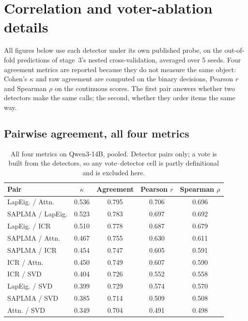 \section{Correlation and voter-ablation details}
\label{sec:correlation_details}

All figures below use each detector under its own published probe, on the
out-of-fold predictions of stage~3's nested cross-validation, averaged over 5 seeds. Four
agreement metrics are reported because they do not measure the same object: Cohen's
$\kappa$ and raw agreement are computed on the binary decisions, Pearson $r$ and
Spearman $\rho$ on the continuous scores. The first pair answers whether two detectors
make the same calls; the second, whether they order items the same way.

\subsection{Pairwise agreement, all four metrics}

\begin{table}[h]
  \centering
  \caption{All four metrics on Qwen3-14B, pooled. Detector pairs only; a vote is
  built from the detectors, so any vote--detector cell is partly definitional and
  is excluded here.}
  \footnotesize
  \begin{tabular}{l c c c c}
    \hline
    Pair & $\kappa$ & Agreement & Pearson $r$ & Spearman $\rho$ \\
    \hline
    LapEig. / Attn. & 0.536 & 0.795 & 0.706 & 0.696 \\
    SAPLMA / LapEig. & 0.523 & 0.783 & 0.697 & 0.692 \\
    LapEig. / ICR & 0.510 & 0.778 & 0.687 & 0.679 \\
    SAPLMA / Attn. & 0.467 & 0.755 & 0.630 & 0.611 \\
    SAPLMA / ICR & 0.454 & 0.747 & 0.605 & 0.591 \\
    ICR / Attn. & 0.450 & 0.749 & 0.607 & 0.590 \\
    ICR / SVD & 0.404 & 0.726 & 0.552 & 0.558 \\
    LapEig. / SVD & 0.399 & 0.729 & 0.574 & 0.570 \\
    SAPLMA / SVD & 0.385 & 0.714 & 0.509 & 0.508 \\
    Attn. / SVD & 0.349 & 0.704 & 0.491 & 0.498 \\
    \hline
  \end{tabular}
\end{table}

